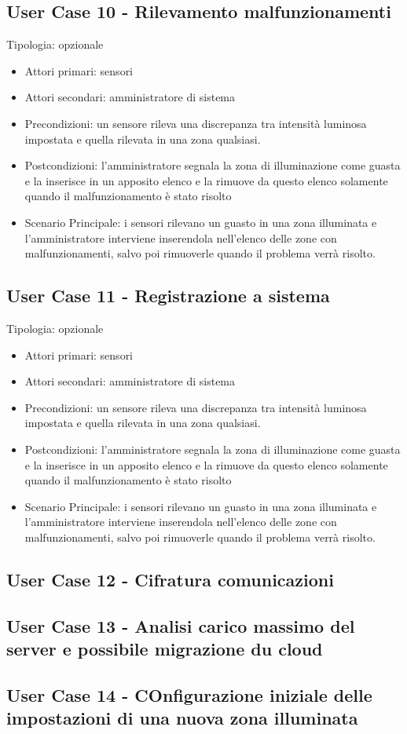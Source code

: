 \documentclass[12pt]{article}
\begin{document}
\subsection{User Case 10 - Rilevamento malfunzionamenti}
Tipologia: opzionale
\begin{itemize}
	\item Attori primari: sensori
	\item Attori secondari: amministratore di sistema
	\item Precondizioni: un sensore rileva una discrepanza tra intensità luminosa impostata e quella rilevata in una zona qualsiasi.
	\item Postcondizioni: l'amministratore segnala la zona di illuminazione come guasta e la inserisce in un apposito elenco e la rimuove da questo elenco solamente quando il malfunzionamento è stato risolto
	\item Scenario Principale: i sensori rilevano un guasto in una zona illuminata e l'amministratore interviene inserendola nell'elenco delle zone con malfunzionamenti, salvo poi rimuoverle quando il problema verrà risolto.
\end{itemize}
\subsection{User Case 11 - Registrazione a sistema}
Tipologia: opzionale
\begin{itemize}
	\item Attori primari: sensori
	\item Attori secondari: amministratore di sistema
	\item Precondizioni: un sensore rileva una discrepanza tra intensità luminosa impostata e quella rilevata in una zona qualsiasi.
	\item Postcondizioni: l'amministratore segnala la zona di illuminazione come guasta e la inserisce in un apposito elenco e la rimuove da questo elenco solamente quando il malfunzionamento è stato risolto
	\item Scenario Principale: i sensori rilevano un guasto in una zona illuminata e l'amministratore interviene inserendola nell'elenco delle zone con malfunzionamenti, salvo poi rimuoverle quando il problema verrà risolto.
\end{itemize}

\subsection{User Case 12 - Cifratura comunicazioni}


\subsection{User Case 13 - Analisi carico massimo del server e possibile migrazione du cloud}

\subsection{User Case 14 - COnfigurazione iniziale delle impostazioni di una nuova zona illuminata}
\end{document}

